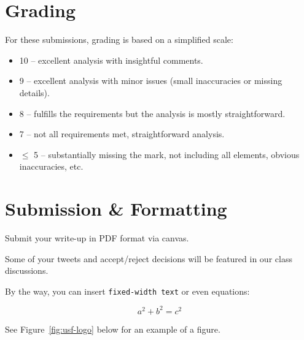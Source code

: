 \documentclass{proc}
\begin{document}
\section{Grading}
For these submissions, grading is based on a simplified scale:
\begin{itemize}
\item 10 -- excellent analysis with insightful comments.
\item 9 -- excellent analysis with minor issues (small inaccuracies or missing details).
\item 8 -- fulfills the requirements but the analysis is mostly straightforward.
\item 7 -- not all requirements met, straightforward analysis.
\item $\leq$ 5 -- substantially missing the mark, not including all elements, obvious inaccuracies, etc.
\end{itemize}

\section{Submission \& Formatting}
Submit your write-up in PDF format via canvas. \vspace{1em} %

\noindent Some of your tweets and accept/reject decisions will be featured in our class discussions.

By the way, you can insert \texttt{fixed-width text} or even equations:

\begin{equation}
    \label{simple_equation}
    a^2 + b^2 = c^2
\end{equation}

\noindent See Figure~\ref{fig:usf-logo} below for an example of a figure.
\end{document}
